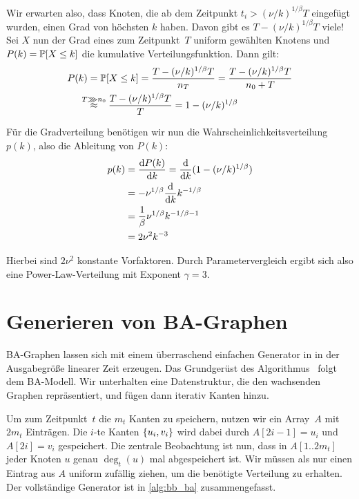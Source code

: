 Wir erwarten also, dass Knoten, die ab dem Zeitpunkt $t_i > (\nu / k)^{1/\beta} T$ eingefügt wurden, einen Grad von höchsten $k$ haben.
Davon gibt es $T - (\nu / k)^{1/\beta} T$ viele!
Sei $X$ nun der Grad eines zum Zeitpunkt~$T$ uniform gewählten Knotens und $P(k) = \mathbb{P}\!\left[X \le k\right]$ die kumulative Verteilungsfunktion.
Dann gilt:
\begin{align}
    P(k) & = \prob{X \le k} = \frac{T - (\nu / k)^{1/\beta} T}{n_T} = \frac{T - (\nu / k)^{1/\beta} T}{n_0 + T} \\
         & \stackrel{\mathclap{T \ggg n_0}}{\approx} \quad\! \frac{T - (\nu / k)^{1/\beta} T}{T} = 1 - (\nu / k)^{1/\beta}
\end{align}

Für die Gradverteilung benötigen wir nun die Wahrscheinlichkeitsverteilung $p(k)$, also die Ableitung von $P(k)$:
\begin{align}
    p(k) & = \frac{\text d P(k)}{\text d k} = \frac{\text d}{\text d k} (1 - (\nu / k)^{1/\beta}) \\
         & = - \nu ^ {1/\beta}  \frac{\text d}{\text d k} k ^{-1/\beta}                       \\
         & = \frac{1}{\beta} \nu ^{1 / \beta} k^{-1/\beta - 1}                            \\
         & = 2 \nu^2 k^{-3}
\end{align}

Hierbei sind $2 \nu^2$ konstante Vorfaktoren.
Durch Parametervergleich ergibt sich also eine Power-Law-Verteilung mit Exponent $\gamma = 3$.

\section{Generieren von BA-Graphen}
BA-Graphen lassen sich mit einem überraschend einfachen Generator in in der Ausgabegröße linearer Zeit erzeugen.
Das Grundgerüst des Algorithmus~\cite{batagelj2005efficient} folgt dem BA-Modell.
Wir unterhalten eine Datenstruktur, die den wachsenden Graphen repräsentiert, und fügen dann iterativ Kanten hinzu.

Um zum Zeitpunkt~$t$ die $m_t$ Kanten zu speichern, nutzen wir ein Array~$A$ mit $2m_t$ Einträgen.
Die $i$-te Kanten $\left\{u_i, v_i\right\}$ wird dabei durch $A[2i - 1] = u_i$ und $A[2i] = v_i$ gespeichert.
Die zentrale Beobachtung ist nun, dass in $A[1 .. 2m_t]$ jeder Knoten $u$ genau $\deg_t(u)$ mal abgespeichert ist.
Wir müssen als nur einen Eintrag aus $A$ uniform zufällig ziehen, um die benötigte Verteilung zu erhalten.
Der vollständige Generator ist in \cref{alg:bb_ba} zusammengefasst.

